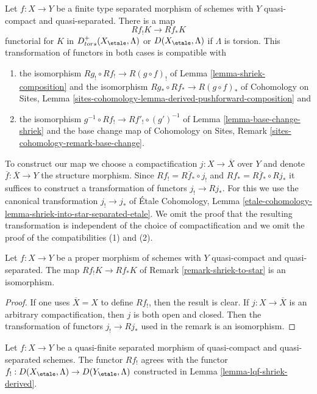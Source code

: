 \begin{remark}
\label{remark-shriek-to-star}
Let $f : X \to Y$ be a finite type separated morphism of schemes
with $Y$ quasi-compact and quasi-separated. There is a map
$$
Rf_!K \longrightarrow Rf_*K
$$
functorial for $K$ in $D^+_{tors}(X_\etale, \Lambda)$ or
$D(X_\etale, \Lambda)$ if $\Lambda$ is torsion. This transformation
of functors in both cases is compatible with
\begin{enumerate}
\item the isomorphism $Rg_! \circ Rf_! \to R(g \circ f)_!$ of
Lemma \ref{lemma-shriek-composition} and the isomorphism
$Rg_* \circ Rf_* \to R(g \circ f)_*$ of
Cohomology on Sites, Lemma
\ref{sites-cohomology-lemma-derived-pushforward-composition} and
\item the isomorphism $g^{-1} \circ Rf_! \to Rf'_! \circ (g')^{-1}$
of Lemma \ref{lemma-base-change-shriek}
and the base change map of
Cohomology on Sites, Remark \ref{sites-cohomology-remark-base-change}.
\end{enumerate}
To construct our map we choose a compactification $j : X \to \overline{X}$
over $Y$ and denote $\overline{f} : \overline{X} \to Y$ the structure morphism.
Since $Rf_! = R\overline{f}_* \circ j_!$ and
$Rf_* = R\overline{f}_* \circ Rj_*$ it suffices to construct a
transformation of functors $j_! \to Rj_*$. For this we use the
canonical transformation $j_! \to j_*$ of
\'Etale Cohomology, Lemma
\ref{etale-cohomology-lemma-shriek-into-star-separated-etale}.
We omit the proof that the resulting transformation is independent
of the choice of compactification and we omit the proof of the
compatibilities (1) and (2).
\end{remark}

\begin{lemma}
\label{lemma-proper-Rf-lower-shriek}
Let $f : X \to Y$ be a proper morphism of schemes with $Y$ quasi-compact
and quasi-separated. The map $Rf_!K \to Rf_*K$ of
Remark \ref{remark-shriek-to-star} is an isomorphism.
\end{lemma}

\begin{proof}
If one uses $\overline{X} = X$ to define $Rf_!$, then the result is clear.
If $j : X \to \overline{X}$ is an arbitrary compactification, then
$j$ is both open and closed. Then the transformation of functors
$j_! \to Rj_*$ used in the remark is an isomorphism.
\end{proof}

\begin{lemma}
\label{lemma-Rf-shriek-for-quasi-finite}
Let $f : X \to Y$ be a quasi-finite separated morphism of quasi-compact and
quasi-separated schemes. The functor $Rf_!$ agrees with the functor
$f_! : D(X_\etale, \Lambda) \to D(Y_\etale, \Lambda)$ constructed in
Lemma \ref{lemma-lqf-shriek-derived}.
\end{lemma}

